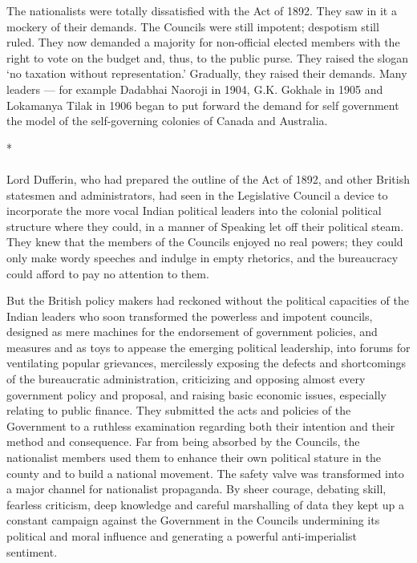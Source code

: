 \begin{multicols}{2}
The nationalists were totally dissatisfied with the Act of 1892. They saw in it a mockery of their demands. The Councils were still impotent; despotism still ruled. They now demanded a majority for non-official elected members with the right to vote on the budget and, thus, to the public purse. They raised the slogan `no taxation without representation.' Gradually, they raised their demands. Many leaders --- for example Dadabhai Naoroji in 1904, G.K. Gokhale in 1905 and Lokamanya Tilak in 1906 began to put forward the demand for self government the model of the self-governing colonies of Canada and Australia.

\begin{center}*\end{center}

\paragraph*{}

Lord Dufferin, who had prepared the outline of the Act of 1892, and other British statesmen and administrators, had seen in the Legislative Council a device to incorporate the more vocal Indian political leaders into the colonial political structure where they could, in a manner of Speaking let off their political steam. They knew that the members of the Councils enjoyed no real powers; they could only make wordy speeches and indulge in empty rhetorics, and the bureaucracy could afford to pay no attention to them.

But the British policy makers had reckoned without the political capacities of the Indian leaders who soon transformed the powerless and impotent councils, designed as mere machines for the endorsement of government policies, and measures and as toys to appease the emerging political leadership, into forums for ventilating popular grievances, mercilessly exposing the defects and shortcomings of the bureaucratic administration, criticizing and opposing almost every government policy and proposal, and raising basic economic issues, especially relating to public finance. They submitted the acts and policies of the Government to a ruthless examination regarding both their intention and their method and consequence. Far from being absorbed by the Councils, the nationalist members used them to enhance their own political stature in the county and to build a national movement. The safety valve was transformed into a major channel for nationalist propaganda. By sheer courage, debating skill, fearless criticism, deep knowledge and careful marshalling of data they kept up a constant campaign against the Government in the Councils undermining its political and moral influence and generating a powerful anti-imperialist sentiment.


\end{multicols}
